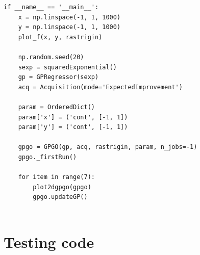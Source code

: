 \documentclass[10pt,a4paper,twoside]{book}
\begin{document}
\begin{verbatim}
if __name__ == '__main__':
    x = np.linspace(-1, 1, 1000)
    y = np.linspace(-1, 1, 1000)
    plot_f(x, y, rastrigin)

    np.random.seed(20)
    sexp = squaredExponential()
    gp = GPRegressor(sexp)
    acq = Acquisition(mode='ExpectedImprovement')

    param = OrderedDict()
    param['x'] = ('cont', [-1, 1])
    param['y'] = ('cont', [-1, 1])

    gpgo = GPGO(gp, acq, rastrigin, param, n_jobs=-1)
    gpgo._firstRun()

    for item in range(7):
        plot2dgpgo(gpgo)
        gpgo.updateGP()
               
\end{verbatim}

\section*{Testing code}
\end{document}
